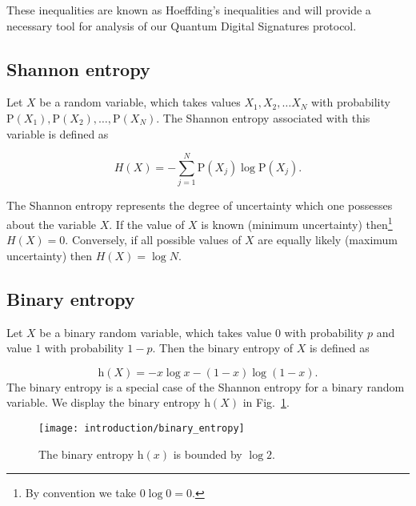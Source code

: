 \noindent These inequalities are known as Hoeffding's inequalities \cite{Hoeffding1963} and will provide a necessary tool for analysis of our Quantum Digital Signatures protocol.



\FloatBarrier
\subsection{Shannon entropy}\label{sec:intro_shannon_entropy}
Let $X$ be a random variable, which takes values $X_1, X_2, \dots X_N$ with probability $\text{P}\left(X_1\right), \text{P}\left(X_2\right),\dots,\text{P}\left(X_N\right)$. The Shannon entropy associated with this variable is defined as 

\begin{equation}
H\left(X\right) = - \sum_{j=1}^N \text{P}\left(X_j\right) \log \text{P}\left(X_j\right).
\end{equation}

\noindent The Shannon entropy represents the degree of uncertainty which one possesses about the variable $X$. If the value of $X$ is known (minimum uncertainty) then\footnote{By convention we take $0 \log 0 = 0$.} $H\left(X\right) = 0$. Conversely, if all possible values of $X$ are equally likely (maximum uncertainty) then $H\left(X\right) = \log N$.

\FloatBarrier
\subsection{Binary entropy}
Let $X$ be a binary random variable, which takes value $0$ with probability $p$ and value $1$ with probability $1-p$. Then the binary entropy of $X$ is defined as

\begin{equation}\label{eqn:intro_binary_entropy}
\text{h}\left(X\right) = - x \log x - \left(1-x\right) \log \left(1-x\right).
\end{equation}
The binary entropy is a special case of the Shannon entropy for a binary random variable. We display the binary entropy $\text{h}\left(X\right)$ in Fig.~\ref{fig:binary_entropy}.

\begin{figure}[htp]
\centering
\captionsetup{width=0.8\linewidth}
\texttt{[image: introduction/binary\_entropy]}
\caption{\label{fig:binary_entropy} The binary entropy $\text{h}\left(x\right)$ is bounded by $\log 2$.}
\end{figure}


